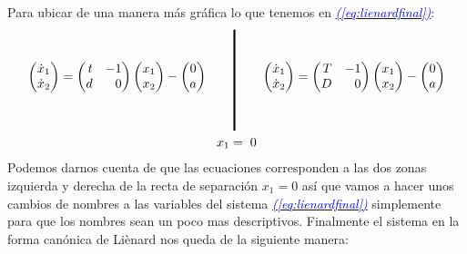 \documentclass[12pt,a4paper]{report} %
\newcommand{\eref}[1]{\hyperref[#1]{\textcolor{blue}{\textit{(\ref*{#1})}}}}
\begin{document}
	Para ubicar de una manera más gráfica lo que tenemos en \eref{eq:lienardfinal}:
	\begin{equation}
		\label{eq:lienardfinalgr}
		\begin{gathered}
			\begin{pmatrix*}[r]
				\dot{x}_1\\ \dot{x}_2
			\end{pmatrix*}= \begin{pmatrix*}[r]
				t & -1 \\ d & 0
			\end{pmatrix*} \begin{pmatrix*}[r]
				x_1 \\ x_2
			\end{pmatrix*}-\begin{pmatrix*}[c]
				0 \\ a
			\end{pmatrix*} \qquad 
			\rule[-40pt]{1.5pt}{80pt} \qquad 
			\begin{pmatrix*}[r]
				\dot{x}_1\\ \dot{x}_2
			\end{pmatrix*}= \begin{pmatrix*}[r]
				T & -1 \\ D & 0
			\end{pmatrix*} \begin{pmatrix*}[r]
				x_1 \\ x_2
			\end{pmatrix*}-\begin{pmatrix*}[c]
				0 \\ a
			\end{pmatrix*} \\ x_1=\;0
		\end{gathered}
	\end{equation}\smallskip
	\newpage
	Podemos darnos cuenta de que las ecuaciones corresponden a las dos zonas izquierda y derecha de la recta de separación $x_1=0$ así que vamos a hacer unos cambios de nombres a las variables del sistema \eref{eq:lienardfinal} simplemente para que los nombres sean un poco mas descriptivos. Finalmente el sistema en la forma canónica de Liènard nos queda de la siguiente manera:
	
\end{document}
